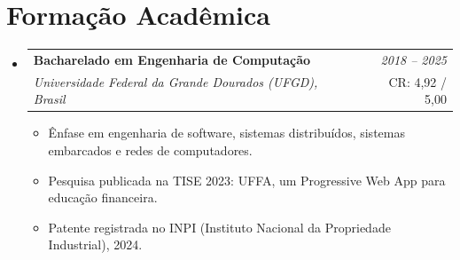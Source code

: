 \documentclass[a4paper,11pt]{article}
\makeatletter
\newcommand{\resumeSubheading}[4]{
\vspace{0.5mm}\item
    \begin{tabular*}{0.98\textwidth}[t]{l@{\extracolsep{\fill}}r}
        \textbf{#1} & \textit{\footnotesize{#4}} \\
        \textit{\footnotesize{#3}} &  \footnotesize{#2}\\
    \end{tabular*}
    \vspace{-2.4mm}
}
\newcommand{\resumeSubHeadingListStart}{\begin{itemize}[leftmargin=*,labelsep=0mm]}
\newcommand{\resumeItemListStart}{\begin{justify}\begin{itemize}[leftmargin=3ex, rightmargin=2ex, noitemsep,labelsep=1.2mm,itemsep=0mm]\small}
\newcommand{\resumeSubHeadingListEnd}{\end{itemize}\vspace{2mm}}
\newcommand{\resumeItemListEnd}{\end{itemize}\end{justify}\vspace{-2mm}}
\makeatother
\begin{document}
\section{\textbf{Formação Acadêmica}}
  \resumeSubHeadingListStart
    \resumeSubheading
      {Bacharelado em Engenharia de Computação}{CR: 4,92 / 5,00}
      {Universidade Federal da Grande Dourados (UFGD), Brasil}{2018 -- 2025}
      \resumeItemListStart
        \item{Ênfase em engenharia de software, sistemas distribuídos, sistemas embarcados e redes de computadores.}
        \item{Pesquisa publicada na TISE 2023: UFFA, um Progressive Web App para educação financeira.}
        \item{Patente registrada no INPI (Instituto Nacional da Propriedade Industrial), 2024.}
      \resumeItemListEnd
  \resumeSubHeadingListEnd
\vspace{-5.5mm}
\end{document}
